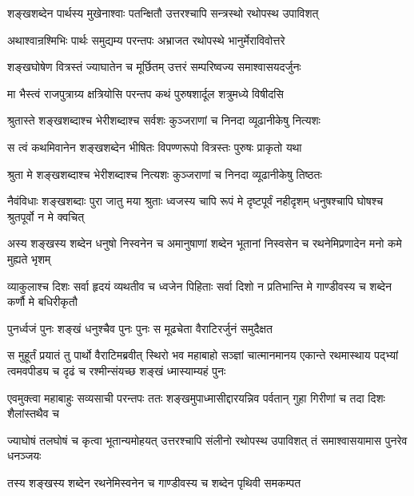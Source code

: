 \twolineshloka
{शङ्खशब्देन पार्थस्य मुखेनाश्वाः पतन्क्षितौ}
{उत्तरश्चापि सन्त्रस्थो रथोपस्थ उपाविशत्}


\twolineshloka
{अथाश्वान्रश्मिभिः पार्थः समुद्यम्य परन्तपः}
{अभ्राजत रथोपस्थे भानुर्मेराविवोत्तरे}


\twolineshloka
{शङ्खघोषेण वित्रस्तं ज्याघातेन च मूर्छितम्}
{उत्तरं सम्परिष्वज्य समाश्वासयदर्जुनः}


\twolineshloka
{मा भैस्त्वं राजपुत्राग्र्य क्षत्रियोसि परन्तप}
{कथं पुरुषशार्दूल शत्रुमध्ये विषीदसि}


\twolineshloka
{श्रुतास्ते शङ्खशब्दाश्च भेरीशब्दाश्च सर्वशः}
{कुञ्जराणां च निनदा व्यूढानीकेषु नित्यशः}


\twolineshloka
{स त्वं कथमिवानेन शङ्खशब्देन भीषितः}
{विपण्णरूपो वित्रस्तः पुरुषः प्राकृतो यथा}




\twolineshloka
{श्रुता मे शङ्खशब्दाश्च भेरीशब्दाश्च नित्यशः}
{कुञ्जराणां च निनदा व्यूढानीकेषु तिष्ठतः}


\threelineshloka
{नैवंविधाः शङ्खशब्दाः पुरा जातु मया श्रुताः}
{ध्वजस्य चापि रूपं मे दृष्टपूर्वं नहीदृशम्}
{धनुषश्चापि घोषश्च श्रुतपूर्वो न मे क्वचित्}


\threelineshloka
{अस्य शङ्खस्य शब्देन धनुषो निस्वनेन च}
{अमानुषाणां शब्देन भूतानां निस्वसेन च}
{रथनेमिप्रणादेन मनो कमे मुह्यते भृशम्}


\threelineshloka
{व्याकुलाश्च दिशः सर्वा हृदयं व्यथतीव च}
{ध्वजेन पिहिताः सर्वा दिशो न प्रतिभान्ति मे}
{गाण्डीवस्य च शब्देन कर्णौ मे बधिरीकृतौ}



\twolineshloka
{पुनर्ध्वजं पुनः शङ्खं धनुश्चैव पुनः पुनः}
{स मूढचेता वैराटिरर्जुनं समुदैक्षत}


\onelineshloka
{स मुहूर्तं प्रयातं तु पार्थो वैराटिमब्रवीत्}
\threelineshloka
{स्थिरो भव महाबाहो सञ्ज्ञां चात्मानमानय}
{एकान्ते रथमास्थाय पद्भ्यां त्वमवपीड्य च}
{दृढं च रश्मीन्संयच्छ शङ्खं ध्मास्याम्यहं पुनः}


\threelineshloka
{एवमुक्त्वा महाबाहुः सव्यसाची परन्तपः}
{ततः शङ्खमुपाध्मासीद्दारयन्निव पर्वतान्}
{गुहा गिरीणां च तदा दिशः शैलांस्तथैव च}


\threelineshloka
{ज्याघोषं तलघोषं च कृत्वा भूतान्यमोहयत्}
{उत्तरश्चापि संलीनो रथोपस्थ उपाविशत्}
{तं समाश्वासयामास पुनरेव धनञ्जयः}


\twolineshloka
{तस्य शङ्खस्य शब्देन रथनेमिस्वनेन च}
{गाण्डीवस्य च शब्देन पृथिवी समकम्पत}

